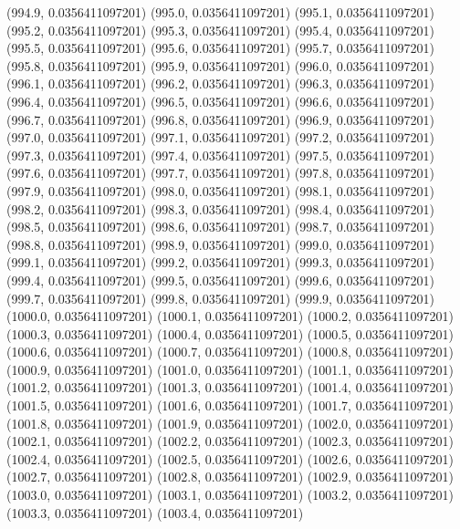 {					(994.9, 0.0356411097201)
					(995.0, 0.0356411097201)
					(995.1, 0.0356411097201)
					(995.2, 0.0356411097201)
					(995.3, 0.0356411097201)
					(995.4, 0.0356411097201)
					(995.5, 0.0356411097201)
					(995.6, 0.0356411097201)
					(995.7, 0.0356411097201)
					(995.8, 0.0356411097201)
					(995.9, 0.0356411097201)
					(996.0, 0.0356411097201)
					(996.1, 0.0356411097201)
					(996.2, 0.0356411097201)
					(996.3, 0.0356411097201)
					(996.4, 0.0356411097201)
					(996.5, 0.0356411097201)
					(996.6, 0.0356411097201)
					(996.7, 0.0356411097201)
					(996.8, 0.0356411097201)
					(996.9, 0.0356411097201)
					(997.0, 0.0356411097201)
					(997.1, 0.0356411097201)
					(997.2, 0.0356411097201)
					(997.3, 0.0356411097201)
					(997.4, 0.0356411097201)
					(997.5, 0.0356411097201)
					(997.6, 0.0356411097201)
					(997.7, 0.0356411097201)
					(997.8, 0.0356411097201)
					(997.9, 0.0356411097201)
					(998.0, 0.0356411097201)
					(998.1, 0.0356411097201)
					(998.2, 0.0356411097201)
					(998.3, 0.0356411097201)
					(998.4, 0.0356411097201)
					(998.5, 0.0356411097201)
					(998.6, 0.0356411097201)
					(998.7, 0.0356411097201)
					(998.8, 0.0356411097201)
					(998.9, 0.0356411097201)
					(999.0, 0.0356411097201)
					(999.1, 0.0356411097201)
					(999.2, 0.0356411097201)
					(999.3, 0.0356411097201)
					(999.4, 0.0356411097201)
					(999.5, 0.0356411097201)
					(999.6, 0.0356411097201)
					(999.7, 0.0356411097201)
					(999.8, 0.0356411097201)
					(999.9, 0.0356411097201)
					(1000.0, 0.0356411097201)
					(1000.1, 0.0356411097201)
					(1000.2, 0.0356411097201)
					(1000.3, 0.0356411097201)
					(1000.4, 0.0356411097201)
					(1000.5, 0.0356411097201)
					(1000.6, 0.0356411097201)
					(1000.7, 0.0356411097201)
					(1000.8, 0.0356411097201)
					(1000.9, 0.0356411097201)
					(1001.0, 0.0356411097201)
					(1001.1, 0.0356411097201)
					(1001.2, 0.0356411097201)
					(1001.3, 0.0356411097201)
					(1001.4, 0.0356411097201)
					(1001.5, 0.0356411097201)
					(1001.6, 0.0356411097201)
					(1001.7, 0.0356411097201)
					(1001.8, 0.0356411097201)
					(1001.9, 0.0356411097201)
					(1002.0, 0.0356411097201)
					(1002.1, 0.0356411097201)
					(1002.2, 0.0356411097201)
					(1002.3, 0.0356411097201)
					(1002.4, 0.0356411097201)
					(1002.5, 0.0356411097201)
					(1002.6, 0.0356411097201)
					(1002.7, 0.0356411097201)
					(1002.8, 0.0356411097201)
					(1002.9, 0.0356411097201)
					(1003.0, 0.0356411097201)
					(1003.1, 0.0356411097201)
					(1003.2, 0.0356411097201)
					(1003.3, 0.0356411097201)
					(1003.4, 0.0356411097201)
}
